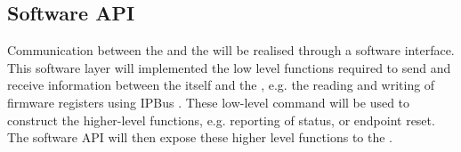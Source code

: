 \documentclass{dune}
\begin{document}
\subsection{Software API}
Communication between the  and the  will be realised through a software interface. This software layer will implemented the low level functions required to send and receive information between the itself and the , e.g. the reading and writing of  firmware registers using IPBus \cite{ipbus}. These low-level command will be used to construct the higher-level functions, e.g. reporting of  status, or endpoint reset. The software API will then expose these higher level functions to the .


\end{document}
